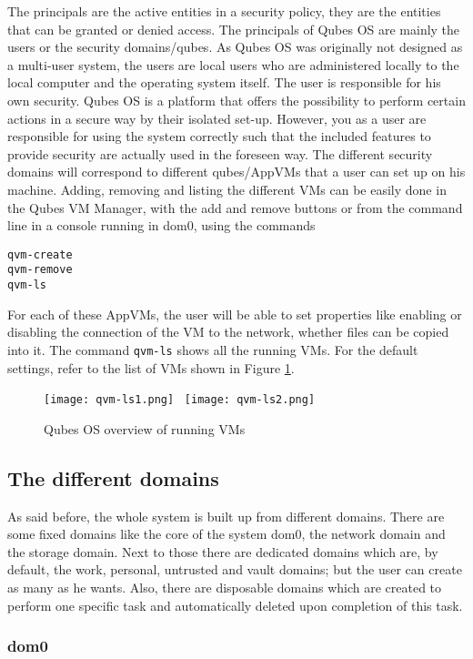 \documentclass[runningheads,a4paper]{article}
\begin{document}
The principals are the active entities in a security policy, they are
the entities that can be granted or denied access. The principals of
Qubes OS are mainly the users or the security domains/qubes.
As Qubes OS was originally not designed
as a multi-user system, the users are local users who are administered
locally to the local computer and the operating system itself. The user is responsible for his own security. Qubes OS is a platform that
offers the possibility to perform certain actions in a secure way by
their isolated set-up. However, you as a user are responsible for
using the system correctly such that the included features to
provide security are actually used in the foreseen way. The different
security domains will correspond to different qubes/AppVMs that a user
can set up on his machine. Adding, removing and listing the different
VMs can be easily done in the Qubes VM Manager, with the add and
remove buttons or from the command line in a console running in dom0,
using the commands
\begin{verbatim}
qvm-create
qvm-remove
qvm-ls
\end{verbatim}
For each of these AppVMs, the user will be able to set properties like
enabling or disabling the connection of the VM to the network, whether
files can be copied into it. 
The command \texttt{qvm-ls} shows all the running VMs. For the default settings, refer to the list of VMs shown in Figure \ref{fig:qvm-ls}.

\begin{figure}[h]
 \centering
 \texttt{[image: qvm-ls1.png]}~
 \texttt{[image: qvm-ls2.png]}
 \caption{Qubes OS overview of running VMs}
 \label{fig:qvm-ls}
\end{figure}

\subsection{The different domains}
As said before, the whole system is built up from different
domains. There are some fixed domains like the core of the system
dom0, the network domain and the storage domain. Next to those there
are dedicated domains which are, by default, the work, personal,
untrusted and vault domains; but the user can create as many as he wants. Also, there are disposable domains which are created to perform one specific task
and automatically deleted upon completion of this task.

\subsubsection{dom0}
\end{document}
